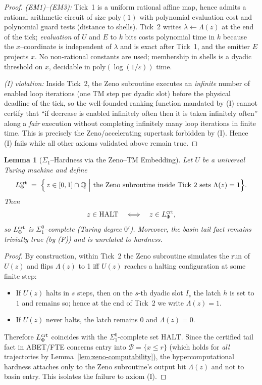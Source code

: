 \documentclass[12pt]{article}
\theoremstyle{definition}
\theoremstyle{plain}
\newtheorem{lemma}{Lemma}[section]
\begin{document}
\begin{proof}
\emph{(EM1)–(EM3):} 
Tick~1 is a uniform rational affine map, hence admits a rational arithmetic circuit of size $\mathrm{poly}(1)$ with polynomial evaluation cost and polynomial guard tests (distance to shells).
Tick~2 writes $\lambda\leftarrow \Lambda(z)$ at the end of the tick; \emph{evaluation} of $U$ and $E$ to $k$ bits costs polynomial time in $k$ because the $x$–coordinate is independent of $\lambda$ and is exact after Tick~1, and the emitter $E$ projects $x$. No non-rational constants are used; membership in shells is a dyadic threshold on $x$, decidable in $\mathrm{poly}(\log(1/\varepsilon))$ time.

\emph{(I) violation:} Inside Tick~2, the Zeno subroutine executes an \emph{infinite} number of enabled loop iterations (one TM step per dyadic slot) before the physical deadline of the tick, so the well-founded ranking function mandated by (I) cannot certify that “if decrease is enabled infinitely often then it is taken infinitely often” along a \emph{fair} execution without completing infinitely many loop iterations in finite time. This is precisely the Zeno/accelerating supertask forbidden by (I). Hence (I) fails while all other axioms validated above remain true.
\end{proof}

\begin{lemma}[\(\Sigma_1\)–Hardness via the Zeno–TM Embedding]
\label{lem:zeno‐hardness}
Let \(U\) be a universal Turing machine and define 
\[
  L_\Phi^{\rm crt}
  \;=\;
  \Bigl\{\,z\in[0,1]\cap\mathbb Q\ \Big|\ 
        \text{the Zeno subroutine inside Tick~2 sets }\Lambda(z)=1\Bigr\}.
\]
Then
\[
  z\in \mathrm{HALT}
  \quad\Longleftrightarrow\quad
  z\in L_\Phi^{\rm crt},
\]
so \(L_\Phi^{\rm crt}\) is \(\Sigma^0_1\)–complete (Turing degree \(0'\)).
Moreover, the \emph{basin tail fact} remains trivially true (by (F)) and is unrelated to hardness.
\end{lemma}

\begin{proof}
By construction, within Tick~2 the Zeno subroutine simulates the run of \(U(z)\) and flips \(\Lambda(z)\) to 1 iff \(U(z)\) reaches a halting configuration at some finite step:
\begin{itemize}
  \item If \(U(z)\) halts in $s$ steps, then on the $s$-th dyadic slot $I_s$ the latch $h$ is set to $1$ and remains so; hence at the end of Tick~2 we write $\Lambda(z)=1$.
  \item If \(U(z)\) never halts, the latch remains $0$ and $\Lambda(z)=0$.
\end{itemize}
Therefore \(L_\Phi^{\rm crt}\) coincides with the \(\Sigma^0_1\)-complete set \(\mathrm{HALT}\).
Since the certified tail fact in ABET/FTE concerns entry into $\mathcal B=\{x\le r\}$ (which holds for \emph{all} trajectories by Lemma~\ref{lem:zeno‐computability}), the hypercomputational hardness attaches only to the Zeno subroutine’s output bit $\Lambda(z)$ and not to basin entry. This isolates the failure to axiom (I).
\end{proof}
\end{document}
